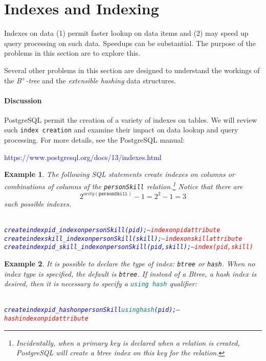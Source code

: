 \documentclass{article}
\newtheorem{example}{Example}
\begin{document}
\newpage
\section{Indexes and Indexing}
Indexes on data (1) permit faster lookup on data items and (2) may speed up query processing on such data.
Speedups can be substantial.     The purpose of the problems in this section are to explore this.   

Several other problems in this section
are designed to understand the workings of the \emph{B$^+$-tree} and the \emph{extensible hashing} data structures.

\paragraph{Discussion}
PostgreSQL permit the creation of a variety of indexes on tables.   We will review such {\tt index creation} and examine their
impact on data lookup and query processing.
For more details, see the PostgreSQL manual:
\begin{center}
\textcolor{blue}{https://www.postgresql.org/docs/13/indexes.html}
\end{center}

\begin{example}
The following SQL statements create indexes on columns or combinations
of columns of the {\tt personSkill} relation.\footnote{Incidentally, when a primary key is declared when 
a relation is created, PostgreSQL will create a btree index on this key for the relation.}   Notice that there are \[2^{arity(\mathtt{personSkill})}-1 = 2^2-1 = 3\] such possible
indexes.  

{\small
\begin{alltt}
\textcolor{blue}{
create index pid_index on personSkill (pid);                  \textcolor{red}{-- index on pid attribute}
create index skill_index on personSkill (skill);              \textcolor{red}{-- index on skill attribute}
create index pid_skill_index on personSkill (pid,skill);      \textcolor{red}{-- index (pid, skill)}
}
\end{alltt}}
\end{example}
\begin{example}
It is possible to declare the type of index: {\tt btree} or {\tt hash}. When no index type is specified, the default is {\tt btree}.
If instead of a Btree, a \emph{hash index} is desired, then it is necessary
to specify a \textcolor{teal}{\tt using hash} qualifier:
{\small
\begin{alltt}
\textcolor{blue}{
create index pid_hash on personSkill \textcolor{teal}{using hash} (pid);  \textcolor{red}{-- hash index on pid attribute }                                                                                                                                              
}
\end{alltt}}
\end{example}
\end{document}
